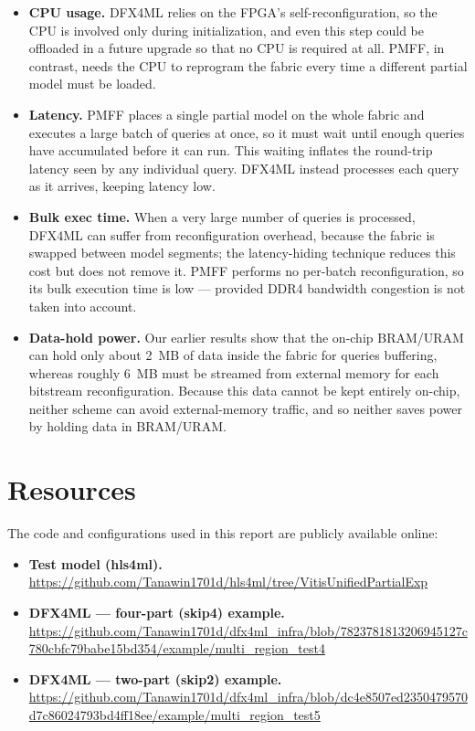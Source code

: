 \documentclass{cernatsnote}
\begin{document}
\begin{itemize}
  \item \textbf{CPU usage.} DFX4ML relies on the FPGA's self-reconfiguration,
  so the CPU is involved only during initialization, and even this step could be
  offloaded in a future upgrade so that no CPU is required at all. PMFF, in
  contrast, needs the CPU to reprogram the fabric every time a different partial
  model must be loaded.

  \item \textbf{Latency.} PMFF places a single partial model on the whole fabric
  and executes a large batch of queries at once, so it must wait until enough
  queries have accumulated before it can run. This waiting inflates the
  round-trip latency seen by any individual query. DFX4ML instead processes each
  query as it arrives, keeping latency low.

  \item \textbf{Bulk exec time.} When a very large number of queries is
  processed, DFX4ML can suffer from reconfiguration overhead, because the fabric
  is swapped between model segments; the latency-hiding technique reduces this
  cost but does not remove it. PMFF performs no per-batch reconfiguration, so its
  bulk execution time is low --- provided DDR4 bandwidth congestion is not taken
  into account.

  \item \textbf{Data-hold power.} Our earlier results show that the on-chip
  BRAM/URAM can hold only about 2~MB of data inside the fabric for queries buffering, whereas roughly
  6~MB must be streamed from external memory for each bitstream reconfiguration.
  Because this data cannot be kept entirely on-chip, neither scheme can avoid
  external-memory traffic, and so neither saves power by holding data in
  BRAM/URAM. 
\end{itemize}

\section{Resources}

The code and configurations used in this report are publicly available online:

\begin{itemize}
  \item \textbf{Test model (hls4ml).}\\
  \url{https://github.com/Tanawin1701d/hls4ml/tree/VitisUnifiedPartialExp}
  \item \textbf{DFX4ML --- four-part (skip4) example.}\\
  \url{https://github.com/Tanawin1701d/dfx4ml_infra/blob/7823781813206945127c780cbfc79babe15bd354/example/multi_region_test4}
  \item \textbf{DFX4ML --- two-part (skip2) example.}\\
  \url{https://github.com/Tanawin1701d/dfx4ml_infra/blob/dc4e8507ed2350479570d7c86024793bd4ff18ee/example/multi_region_test5}
\end{itemize}
\end{document}
